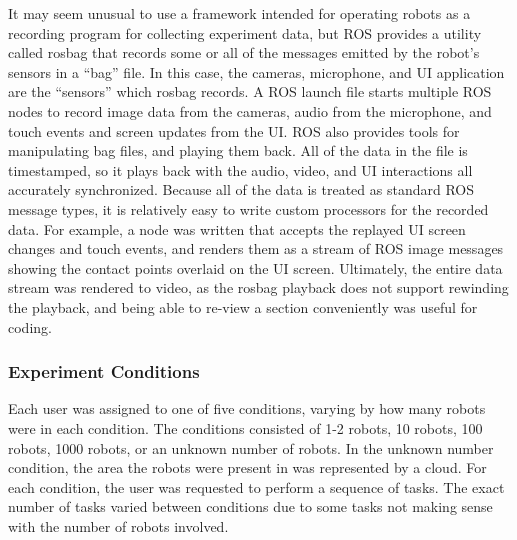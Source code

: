 It may seem unusual to use a framework intended for operating robots as a recording program for collecting experiment data, but ROS provides a utility called rosbag that records some or all of the messages emitted by the robot's sensors in a ``bag'' file. 
In this case, the cameras, microphone, and UI application are the ``sensors'' which rosbag records.
A ROS launch file starts multiple ROS nodes to record image data from the cameras, audio from the microphone, and touch events and screen updates from the UI.
ROS also provides tools for manipulating bag files, and playing them back. 
All of the data in the file is timestamped, so it plays back with the audio, video, and UI interactions all accurately synchronized. 
Because all of the data is treated as standard ROS message types, it is relatively easy to write custom processors for the recorded data.
For example, a node was written that accepts the replayed UI screen changes and touch events, and renders them as a stream of ROS image messages showing the contact points overlaid on the UI screen. 
Ultimately, the entire data stream was rendered to video, as the rosbag playback does not support rewinding the playback, and being able to re-view a section conveniently was useful for coding. 

\subsubsection{Experiment Conditions} \label{section:Experiment_Conditions}

Each user was assigned to one of five conditions, varying by how many robots were in each condition. 
The conditions consisted of 1-2 robots, 10 robots, 100 robots, 1000 robots, or an unknown number of robots.
In the unknown number condition, the area the robots were present in was represented by a cloud. 
For each condition, the user was requested to perform a sequence of tasks. 
The exact number of tasks varied between conditions due to some tasks not making sense with the number of robots involved. 

